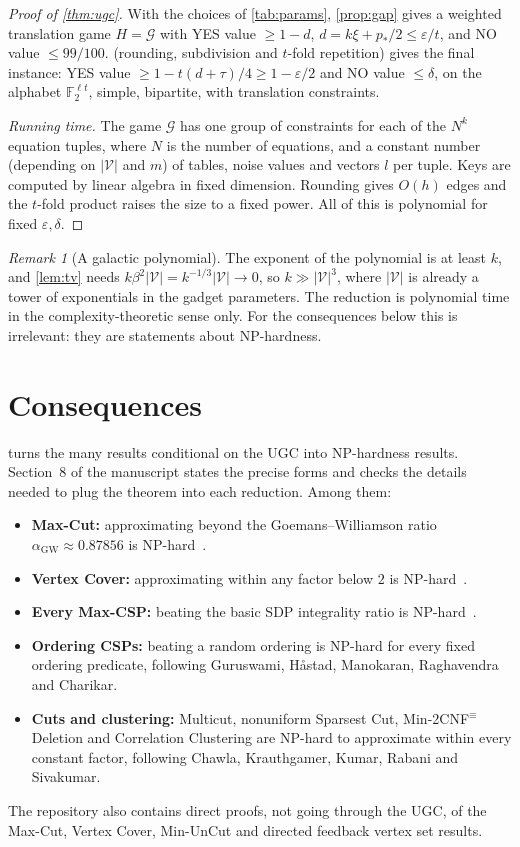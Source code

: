 \documentclass[11pt]{article}
\theoremstyle{definition}
\theoremstyle{remark}
\newtheorem{remark}[theorem]{Remark}
\newcommand{\F}{\mathbb F}
\newcommand{\eps}{\varepsilon}
\newcommand{\V}{\mathcal V}
\newcommand{\cG}{\mathcal G}
\newcommand{\abs}[1]{\lvert #1\rvert}
\begin{document}
\begin{proof}[Proof of \cref{thm:ugc}]
With the choices of \cref{tab:params}, \cref{prop:gap} gives a weighted
translation game $H=\cG$ with YES value $\ge1-d$, $d=k\xi+p_*/2\le\eps/t$, and
NO value $\le99/100$.  (rounding, subdivision and $t$-fold
repetition) gives the final instance: YES value
$\ge1-t(d+\tau)/4\ge1-\eps/2$ and NO value $\le\delta$, on the alphabet
$\F_2^{\ell t}$, simple, bipartite, with translation constraints.

\emph{Running time.} The game $\cG$ has one group of constraints for each of the
$N^k$ equation tuples, where $N$ is the number of equations, and a constant
number (depending on $\abs\V$ and $m$) of tables, noise values and vectors $l$
per tuple. Keys are computed by linear algebra in fixed dimension. Rounding
gives $O(h)$ edges and the $t$-fold product raises the size to a fixed power.
All of this is polynomial for fixed $\eps,\delta$.
\end{proof}

\begin{remark}[A galactic polynomial]\label{rem:galactic}
The exponent of the polynomial is at least $k$, and \cref{lem:tv} needs
$k\beta^2\abs\V=k^{-1/3}\abs\V\to0$, so $k\gg\abs\V^3$, where $\abs\V$ is
already a tower of exponentials in the gadget parameters. The reduction is
polynomial time in the complexity-theoretic sense only. For the consequences
below this is irrelevant: they are statements about NP-hardness.
\end{remark}

\section{Consequences}\label{sec:consequences}

 turns the many results conditional on the UGC into NP-hardness
results. Section~8 of the manuscript states the precise forms and checks the
details needed to plug the theorem into each reduction. Among them:
\begin{itemize}
\item \textbf{Max-Cut:} approximating beyond the Goemans--Williamson ratio
  $\alpha_{\mathrm{GW}}\approx0.87856$ is NP-hard~\cite{KKMO07,GW95}.
\item \textbf{Vertex Cover:} approximating within any factor below $2$ is
  NP-hard~\cite{KhotRegev}.
\item \textbf{Every Max-CSP:} beating the basic SDP integrality ratio is
  NP-hard~\cite{Raghavendra08}.
\item \textbf{Ordering CSPs:} beating a random ordering is NP-hard for every
  fixed ordering predicate, following Guruswami, H{\aa}stad, Manokaran,
  Raghavendra and Charikar.
\item \textbf{Cuts and clustering:} Multicut, nonuniform Sparsest Cut,
  Min-2CNF$^{\equiv}$ Deletion and Correlation Clustering are NP-hard to
  approximate within every constant factor, following Chawla, Krauthgamer,
  Kumar, Rabani and Sivakumar.
\end{itemize}
The repository also contains direct proofs, not going through the UGC, of the
Max-Cut, Vertex Cover, Min-UnCut and directed feedback vertex set results.
\end{document}
